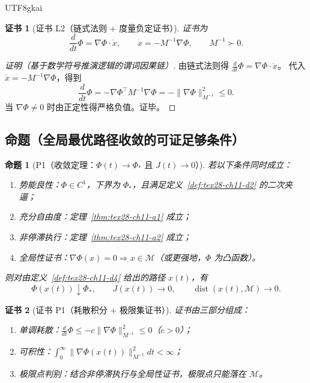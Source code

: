 \documentclass[12pt]{article}
\newtheorem{proposition}{命题}[section]
\newtheorem{Certificate}{证书}[section]
\begin{document}
\begin{CJK*}{UTF8}{gkai}
\begin{Certificate}[证书 L2（链式法则 + 度量负定证书）]
\label{cert:tex28-ch11-l2}
证书为
\[
  \frac{d}{dt}\Phi=\nabla\Phi\cdot\dot x,\qquad
  \dot x=-M^{-1}\nabla\Phi,\qquad
  M^{-1}\succ0.
\]
\end{Certificate}

\begin{proof}[证明（基于数学符号推演逻辑的谓词因果链）]
由链式法则得 $\frac{d}{dt}\Phi=\nabla\Phi\cdot\dot x$。
代入 $\dot x=-M^{-1}\nabla\Phi$，得到
\[
  \frac{d}{dt}\Phi=-\nabla\Phi^\top M^{-1}\nabla\Phi=-\|\nabla\Phi\|_{M^{-1}}^2\le0.
\]
当 $\nabla\Phi\neq0$ 时由正定性得严格负值。证毕。
\end{proof}

\subsection{命题（全局最优路径收敛的可证足够条件）}
\label{subsec:tex28-ch11-props}

\begin{proposition}[P1（收敛定理：$\Phi(t)\to\Phi_*$ 且 $J(t)\to0$）]
\label{prop:tex28-ch11-p1}
若以下条件同时成立：
\begin{enumerate}
  \item 势能良性：$\Phi\in C^1$，下界为 $\Phi_*$，且满足定义~\ref{def:tex28-ch11-d2} 的二次夹逼；
  \item 充分自由度：定理~\ref{thm:tex28-ch11-a1} 成立；
  \item 非停滞执行：定理~\ref{thm:tex28-ch11-a2} 成立；
  \item 全局性证书：$\nabla\Phi(x)=0\Rightarrow x\in\mathcal{M}$（或更强地，$\Phi$ 为凸函数）。
\end{enumerate}
则对由定义~\ref{def:tex28-ch11-d4} 给出的路径 $x(t)$，有
\[
  \Phi(x(t))\downarrow\Phi_*,
  \qquad
  J(x(t))\to0,
  \qquad
  \operatorname{dist}(x(t),\mathcal{M})\to0.
\]
\end{proposition}

\begin{Certificate}[证书 P1（耗散积分 + 极限集证书）]
\label{cert:tex28-ch11-p1}
证书由三部分组成：
\begin{enumerate}
  \item 单调耗散：$\frac{d}{dt}\Phi\le -c\|\nabla\Phi\|_{M^{-1}}^2\le0$（$c>0$）；
  \item 可积性：$\int_0^\infty \|\nabla\Phi(x(t))\|_{M^{-1}}^2dt<\infty$；
  \item 极限点判别：结合非停滞执行与全局性证书，极限点只能落在 $\mathcal{M}$。
\end{enumerate}
\end{Certificate}


\end{CJK*}
\end{document}
